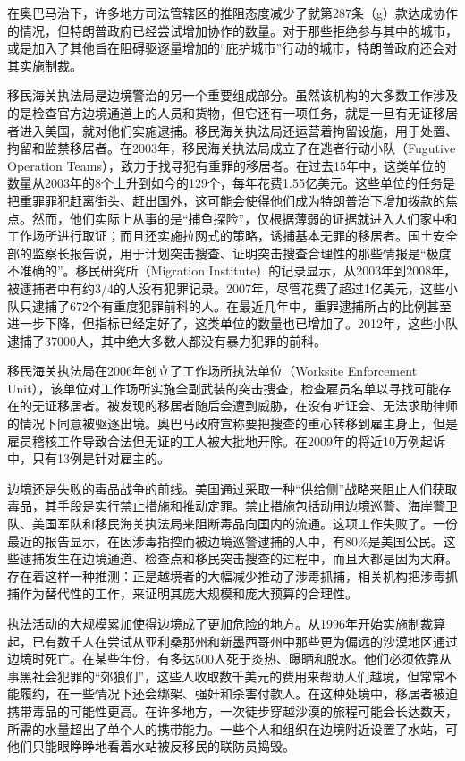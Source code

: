 \documentclass[fontset=fandol, a4paper, 12pt, openright]{ctexbook}
\begin{document}
在奥巴马治下，许多地方司法管辖区的推阻态度减少了就第287条（g）款达成协作的情况，但特朗普政府已经尝试增加协作的数量。对于那些拒绝参与其中的城市，或是加入了其他旨在阻碍驱逐量增加的“庇护城市”行动的城市，特朗普政府还会对其实施制裁。

移民海关执法局是边境警治的另一个重要组成部分。虽然该机构的大多数工作涉及的是检查官方边境通道上的人员和货物，但它还有一项任务，就是一旦有无证移居者进入美国，就对他们实施逮捕。移民海关执法局还运营着拘留设施，用于处置、拘留和监禁移居者。在2003年，移民海关执法局成立了在逃者行动小队（Fugutive Operation Teams），致力于找寻犯有重罪的移居者。在过去15年中，这类单位的数量从2003年的8个上升到如今的129个，每年花费1.55亿美元。这些单位的任务是把重罪罪犯赶离街头、赶出国外，这可能会使得他们成为特朗普治下增加拨款的焦点。然而，他们实际上从事的是“捕鱼探险”，仅根据薄弱的证据就进入人们家中和工作场所进行取证；而且还实施拉网式的策略，诱捕基本无罪的移居者。国土安全部的监察长报告说，用于计划突击搜查、证明突击搜查合理性的那些情报是“极度不准确的”。移民研究所（Migration Institute）的记录显示，从2003年到2008年，被逮捕者中有约3/4的人没有犯罪记录。2007年，尽管花费了超过1亿美元，这些小队只逮捕了672个有重度犯罪前科的人。在最近几年中，重罪逮捕所占的比例甚至进一步下降，但指标已经定好了，这类单位的数量也已增加了。2012年，这些小队逮捕了37000人，其中绝大多数人都没有暴力犯罪的前科。

移民海关执法局在2006年创立了工作场所执法单位（Worksite Enforcement Unit），该单位对工作场所实施全副武装的突击搜查，检查雇员名单以寻找可能存在的无证移居者。被发现的移居者随后会遭到威胁，在没有听证会、无法求助律师的情况下同意被驱逐出境。奥巴马政府宣称要把搜查的重心转移到雇主身上，但是雇员稽核工作导致合法但无证的工人被大批地开除。在2009年的将近10万例起诉中，只有13例是针对雇主的。

边境还是失败的毒品战争的前线。美国通过采取一种“供给侧”战略来阻止人们获取毒品，其手段是实行禁止措施和推动定罪。禁止措施包括动用边境巡警、海岸警卫队、美国军队和移民海关执法局来阻断毒品向国内的流通。这项工作失败了。一份最近的报告显示，在因涉毒指控而被边境巡警逮捕的人中，有80\%是美国公民。这些逮捕发生在边境通道、检查点和移民突击搜查的过程中，而且大都是因为大麻。存在着这样一种推测：正是越境者的大幅减少推动了涉毒抓捕，相关机构把涉毒抓捕作为替代性的工作，来证明其庞大规模和庞大预算的合理性。

执法活动的大规模累加使得边境成了更加危险的地方。从1996年开始实施制裁算起，已有数千人在尝试从亚利桑那州和新墨西哥州中那些更为偏远的沙漠地区通过边境时死亡。在某些年份，有多达500人死于炎热、曝晒和脱水。他们必须依靠从事黑社会犯罪的“郊狼们”，这些人收取数千美元的费用来帮助人们越境，但常常不能履约，在一些情况下还会绑架、强奸和杀害付款人。在这种处境中，移居者被迫携带毒品的可能性更高。在许多地方，一次徒步穿越沙漠的旅程可能会长达数天，所需的水量超出了单个人的携带能力。一些个人和组织在边境附近设置了水站，可他们只能眼睁睁地看着水站被反移民的联防员捣毁。
\end{document}

